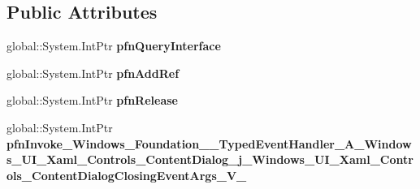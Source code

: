 \subsection*{Public Attributes}
\begin{DoxyCompactItemize}
\item 
\mbox{\label{struct_windows_1_1_foundation_1_1_typed_event_handler___a___windows___u_i___xaml___controls___co9111ad08139b8b08fa2d56786ea22dd0_aa438879bfca9d0724a30d8eea6d2118f}} 
global\+::\+System.\+Int\+Ptr {\bfseries pfn\+Query\+Interface}
\item 
\mbox{\label{struct_windows_1_1_foundation_1_1_typed_event_handler___a___windows___u_i___xaml___controls___co9111ad08139b8b08fa2d56786ea22dd0_a4e0733f6e324b1634028b91d516aaf10}} 
global\+::\+System.\+Int\+Ptr {\bfseries pfn\+Add\+Ref}
\item 
\mbox{\label{struct_windows_1_1_foundation_1_1_typed_event_handler___a___windows___u_i___xaml___controls___co9111ad08139b8b08fa2d56786ea22dd0_a40373646838eda8646635651776ba902}} 
global\+::\+System.\+Int\+Ptr {\bfseries pfn\+Release}
\item 
\mbox{\label{struct_windows_1_1_foundation_1_1_typed_event_handler___a___windows___u_i___xaml___controls___co9111ad08139b8b08fa2d56786ea22dd0_a4a65dee61ef9ba5ffa920e24938721e2}} 
global\+::\+System.\+Int\+Ptr {\bfseries pfn\+Invoke\+\_\+\+Windows\+\_\+\+Foundation\+\_\+\+\_\+\+Typed\+Event\+Handler\+\_\+\+A\+\_\+\+Windows\+\_\+\+U\+I\+\_\+\+Xaml\+\_\+\+Controls\+\_\+\+Content\+Dialog\+\_\+j\+\_\+\+Windows\+\_\+\+U\+I\+\_\+\+Xaml\+\_\+\+Controls\+\_\+\+Content\+Dialog\+Closing\+Event\+Args\+\_\+\+V\+\_\+}
\end{DoxyCompactItemize}
